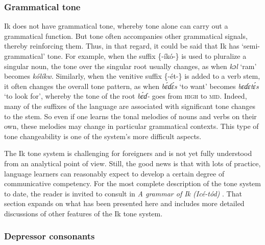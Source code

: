 \subsubsection{Grammatical tone}\label{sec:2.6.3}
\largerpage
Ik does not have grammatical tone, whereby tone alone can carry out a grammatical function. But tone often accompanies other grammatical signals, thereby reinforcing them. Thus, in that regard, it could be said that Ik has ‘semi-gramma\-tical’ tone. For example, when the suffix \{-íkó-\} is used to pluralize a singular noun, the tone over the singular root usually changes, as when \textit{kɔl} ‘ram’ becomes \textit{kólíkw\ᵃ}. Similarly, when the venitive suffix \{-ét-\} is added to a verb stem, it often changes the overall tone pattern, as when \textit{b\'{ɛ}ɗ\'{ɛ}s} ‘to want’ becomes \textit{bɛɗɛt\'{ɛ}s} ‘to look for’, whereby the tone of the root \textit{b\'{ɛ}ɗ-} goes from \textsc{high} to \textsc{mid}. Indeed, many of the suffixes of the language are associated with significant tone changes to the stem. So even if one learns the tonal melodies of nouns and verbs on their own, these melodies may change in particular grammatical contexts. This type of tone changeability is one of the system’s more difficult aspects.

The Ik tone system is challenging for foreigners and is not yet fully understood from an analytical point of view. Still, the good news is that with lots of practice, language learners can reasonably expect to develop a certain degree of communicative competency. For the most complete description of the tone system to date, the reader is invited to consult  in \textit{A grammar of Ik (Icé-tód)} \citep{Schrock2014}. That section expands on what has been presented here and includes more detailed discussions of other features of the Ik tone system.
 
\subsubsection{Depressor consonants}\label{sec:2.6.4} 

